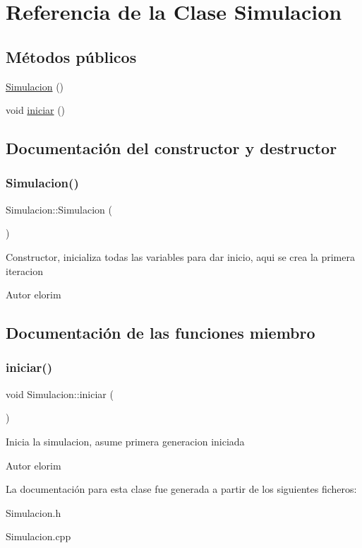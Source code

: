 \hypertarget{classSimulacion}{}\section{Referencia de la Clase Simulacion}
\label{classSimulacion}
\subsection*{Métodos públicos}
\begin{DoxyCompactItemize}
\item 
\hyperlink{classSimulacion_a21941a8bdd4e79c573280ef1629ebcc2}{Simulacion} ()
\item 
void \hyperlink{classSimulacion_a0be03e6a6752772abc42bb7fc74a9103}{iniciar} ()
\end{DoxyCompactItemize}


\subsection{Documentación del constructor y destructor}
\mbox{\label{classSimulacion_a21941a8bdd4e79c573280ef1629ebcc2}} 
\subsubsection{\texorpdfstring{Simulacion()}{Simulacion()}}
{\footnotesize\ttfamily Simulacion\+::\+Simulacion (\begin{DoxyParamCaption}{ }\end{DoxyParamCaption})}

Constructor, inicializa todas las variables para dar inicio, aqui se crea la primera iteracion \begin{DoxyAuthor}{Autor}
elorim 
\end{DoxyAuthor}


\subsection{Documentación de las funciones miembro}
\mbox{\label{classSimulacion_a0be03e6a6752772abc42bb7fc74a9103}} 
\subsubsection{\texorpdfstring{iniciar()}{iniciar()}}
{\footnotesize\ttfamily void Simulacion\+::iniciar (\begin{DoxyParamCaption}{ }\end{DoxyParamCaption})}

Inicia la simulacion, asume primera generacion iniciada \begin{DoxyAuthor}{Autor}
elorim 
\end{DoxyAuthor}


La documentación para esta clase fue generada a partir de los siguientes ficheros\+:\begin{DoxyCompactItemize}
\item 
Simulacion.\+h\item 
Simulacion.\+cpp\end{DoxyCompactItemize}
